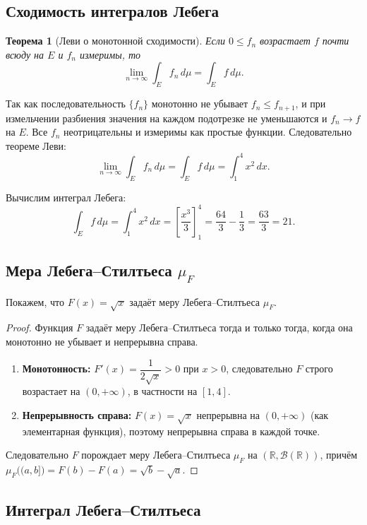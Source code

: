 \documentclass[12pt,a4paper]{article}
\newtheorem{theorem}{Теорема}
\theoremstyle{definition}
\begin{document}
\subsection{Сходимость интегралов Лебега}

\begin{theorem}[Леви о монотонной сходимости]
    Если $0 \leq f_n$ возрастает $f$ почти всюду на $E$ и $f_n$ измеримы, то
    \[
        \lim_{n \to \infty} \int_E f_n \, d\mu = \int_E f \, d\mu.
    \]
\end{theorem}

Так как последовательность $\{f_n\}$ монотонно не убывает $f_n \leq f_{n+1}$, и при
измельчении разбиения значения на каждом подотрезке не уменьшаются и $f_n \to f$
на $E$. Все $f_n$ неотрицательны и измеримы как простые функции. Следовательно теореме Леви:
\[
    \lim_{n \to \infty} \int_E f_n \, d\mu = \int_E f \, d\mu = \int_1^4 x^2 \, dx.
\]

Вычислим интеграл Лебега:
\[
    \int_E f \, d\mu = \int_1^4 x^2 \, dx
    = \left[\frac{x^3}{3}\right]_1^4
    = \frac{64}{3} - \frac{1}{3} = \frac{63}{3} = 21.
\]

\subsection{Мера Лебега–Стилтьеса $\mu_F$}

Покажем, что $F(x) = \sqrt{x}$ задаёт меру Лебега–Стилтьеса $\mu_F$.

\begin{proof}
    Функция $F$ задаёт меру Лебега–Стилтьеса тогда и только тогда, когда она
    монотонно не убывает и непрерывна справа.
    \begin{enumerate}
        \item \textbf{Монотонность:} $F'(x) = \dfrac{1}{2\sqrt{x}} > 0$ при $x > 0$,
              следовательно $F$ строго возрастает на $(0,+\infty)$, в частности на $[1,4]$.
        \item \textbf{Непрерывность справа:} $F(x) = \sqrt{x}$ непрерывна на $(0, +\infty)$
              (как элементарная функция), поэтому непрерывна справа в каждой точке.
    \end{enumerate}
    Следовательно $F$ порождает меру Лебега–Стилтьеса $\mu_F$ на $(\mathbb{R}, \mathcal{B}(\mathbb{R}))$,
    причём $\mu_F\bigl((a,b]\bigr) = F(b) - F(a) = \sqrt{b} - \sqrt{a}$.
\end{proof}

\subsection{Интеграл Лебега–Стилтьеса}
\end{document}
